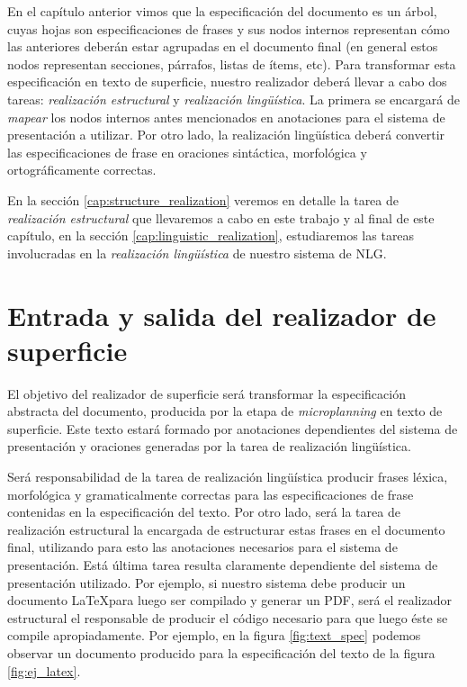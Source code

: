 En el capítulo anterior vimos que la especificación del documento es un árbol, cuyas hojas son especificaciones de frases y sus nodos internos representan cómo las anteriores deberán estar agrupadas en el documento final (en general estos nodos representan secciones, párrafos, listas de ítems, etc). Para transformar esta especificación en texto de superficie, nuestro realizador deberá llevar a cabo dos tareas: \emph{realización estructural} y \emph{realización lingüística}. La primera se encargará de \emph{mapear} los nodos internos antes mencionados en anotaciones para el sistema de presentación a utilizar. Por otro lado, la realización lingüística deberá convertir las especificaciones de frase en oraciones sintáctica, morfológica y ortográficamente correctas.

En la sección \ref{cap:structure_realization} veremos en detalle la tarea de \emph{realización estructural} que llevaremos a cabo en este trabajo y al final de este capítulo, en la sección \ref{cap:linguistic_realization}, estudiaremos las tareas involucradas en la \emph{realización lingüística} de nuestro sistema de NLG.

\section{Entrada y salida del realizador de superficie}

El objetivo del realizador de superficie será transformar la especificación abstracta del documento, producida por la etapa de \textit{microplanning} en texto de superficie. Este texto estará formado por anotaciones dependientes del sistema de presentación y oraciones generadas por la tarea de realización lingüística.

Será responsabilidad de la tarea de realización lingüística producir frases léxica, morfológica y gramaticalmente correctas para las especificaciones de frase contenidas en la especificación del texto. Por otro lado, será la tarea de realización estructural la encargada de estructurar estas frases en el documento final, utilizando para esto las anotaciones necesarios para el sistema de presentación. Está última tarea resulta claramente dependiente del sistema de presentación utilizado. Por ejemplo, si nuestro sistema debe producir un documento \LaTeX para luego ser compilado y generar un PDF, será el realizador estructural el responsable de producir el código necesario para que luego éste se compile apropiadamente. Por ejemplo, en la figura \ref{fig:text_spec} podemos observar un documento producido para la especificación del texto de la figura \ref{fig:ej_latex}.

